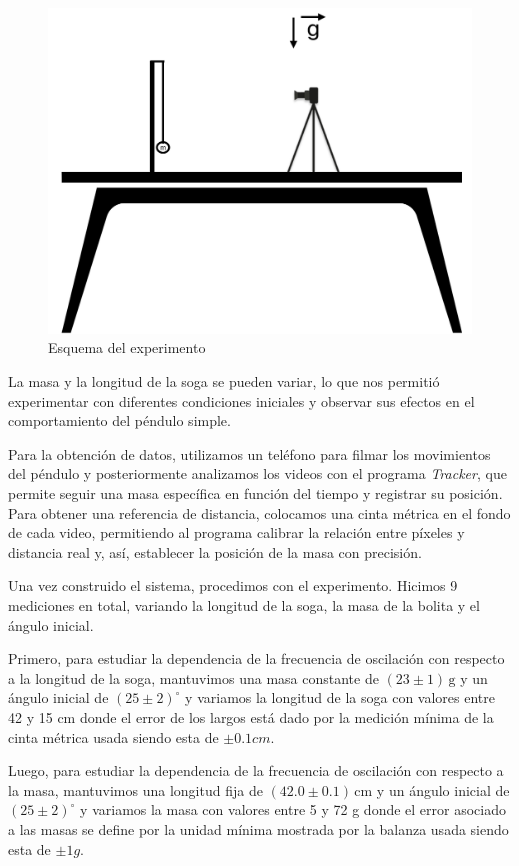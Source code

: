 \documentclass[12pt,a4]{article}
\begin{document}
\begin{figure}[H]
    \centering
    \includegraphics[width=0.6\linewidth]{esquema.png}
    \caption{Esquema del experimento}   
    \label{fig:esquema}
\end{figure}

La masa y la longitud de la soga se pueden variar, lo que nos permitió experimentar con diferentes condiciones iniciales y observar sus efectos en el comportamiento del péndulo simple.

Para la obtención de datos, utilizamos un teléfono para filmar los movimientos del péndulo y posteriormente analizamos los videos con el programa \textit{Tracker}, que permite seguir una masa específica en función del tiempo y registrar su posición. 
Para obtener una referencia de distancia, colocamos una cinta métrica en el fondo de cada video, permitiendo al programa calibrar la relación entre píxeles y distancia real y, así, establecer la posición de la masa con precisión.

Una vez construido el sistema, procedimos con el experimento. Hicimos 9 mediciones en total, variando la longitud de la soga, la masa de la bolita y el ángulo inicial.

Primero, para estudiar la dependencia de la frecuencia de oscilación con respecto a la longitud de la soga, mantuvimos una masa constante de $(23 \pm 1) \, \text{g}$ y un ángulo inicial de $(25 \pm 2)^\circ$ y variamos la longitud de la soga con valores entre 
42 y 15 cm donde el error de los largos está dado por la medición mínima de la cinta métrica usada siendo esta de $\pm 0.1 cm$.

Luego, para estudiar la dependencia de la frecuencia de oscilación con respecto a la masa, mantuvimos una longitud fija de $(42.0 \pm 0.1) \, \text{cm}$ y un ángulo inicial de $(25 \pm 2)^\circ$ y variamos la masa con valores entre 
5 y 72 g donde el error asociado a las masas se define por la unidad mínima mostrada por la balanza usada siendo esta de $\pm 1 g$.
\end{document}
